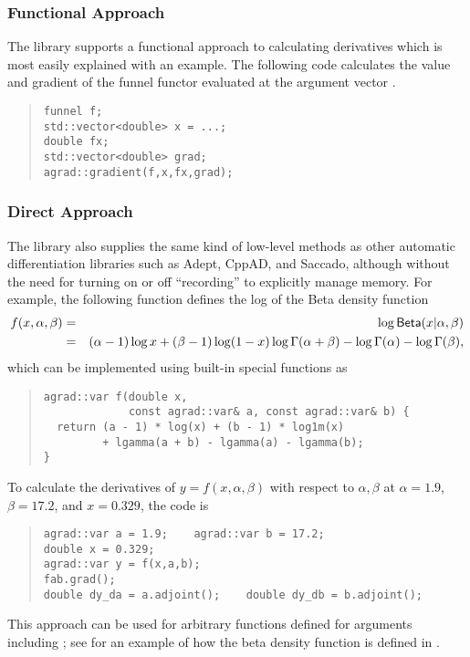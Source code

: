 \documentclass[10pt]{article}
\begin{document}
\subsubsection{Functional Approach}

The  library supports a functional approach to calculating
derivatives which is most easily explained with an example. The
following code calculates the value  and gradient 
of the funnel functor  evaluated at the argument vector
.
%
\begin{quote}
\begin{Verbatim}
funnel f;
std::vector<double> x = ...;
double fx;
std::vector<double> grad;
agrad::gradient(f,x,fx,grad);
\end{Verbatim}
\end{quote}

\subsubsection{Direct Approach}

The  library also supplies the same kind of low-level
methods as other automatic differentiation libraries such as Adept,
CppAD, and Saccado, although without the need for turning on or off
``recording'' to explicitly manage memory. For example, the following
function defines the log of the Beta density function
%
\begin{eqnarray*}
f(x,\alpha,\beta) 
& = & \log \mbox{\sf Beta}(x|\alpha,\beta)
\\
& = & (\alpha - 1) \log x + (\beta - 1) \log (1 - x) 
  \log \Gamma(\alpha + \beta) - \log \Gamma(\alpha) - \log
  \Gamma(\beta),
\end{eqnarray*}
%
which can be implemented using built-in special functions as
%
\begin{quote}
\begin{Verbatim}
agrad::var f(double x, 
             const agrad::var& a, const agrad::var& b) {
  return (a - 1) * log(x) + (b - 1) * log1m(x)
         + lgamma(a + b) - lgamma(a) - lgamma(b);
}
\end{Verbatim}
\end{quote}
%
To calculate the derivatives of $y = f(x,\alpha,\beta)$ with respect to
$\alpha,\beta$ at
$\alpha = 1.9$, $\beta = 17.2$, and  $x = 0.329$, the code is
%
\begin{quote}
\begin{Verbatim}
agrad::var a = 1.9;    agrad::var b = 17.2;
double x = 0.329;
agrad::var y = f(x,a,b);
fab.grad();
double dy_da = a.adjoint();    double dy_db = b.adjoint();
\end{Verbatim}
\end{quote}
%
This approach can be used for arbitrary functions defined for
arguments including ; see 
for an example of how the beta density function is defined in
.
\end{document}
